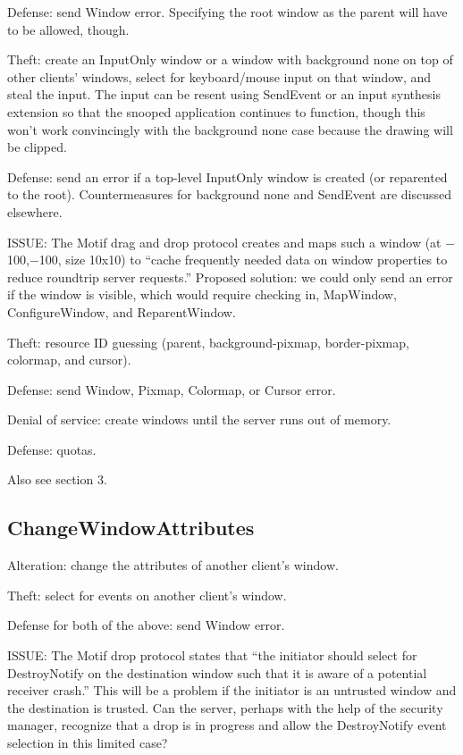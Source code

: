 Defense: send Window error.  Specifying the root window as the parent will
have to be allowed, though.

Theft: create an InputOnly window or a window with background none on
top of other clients' windows, select for keyboard/mouse input on that
window, and steal the input.  The input can be resent using SendEvent
or an input synthesis extension so that the snooped application
continues to function, though this won't work convincingly with the
background none case because the drawing will be clipped.

Defense: send an error if a top-level InputOnly window is created (or
reparented to the root).  Countermeasures for background none and
SendEvent are discussed elsewhere.

ISSUE: The Motif drag and drop protocol creates and maps such a window
(at $-$100,$-$100, size 10x10) to ``cache frequently needed data on
window properties to reduce roundtrip server requests.''  Proposed
solution: we could only send an error if the window is visible, which
would require checking in, MapWindow, ConfigureWindow, and
ReparentWindow.

Theft: resource ID guessing (parent, background-pixmap, border-pixmap,
colormap, and cursor).

Defense: send Window, Pixmap, Colormap, or Cursor error.

Denial of service: create windows until the server runs out of memory.

Defense: quotas.

Also see section 3.


\subsection{ChangeWindowAttributes}

Alteration: change the attributes of another client's window.

Theft: select for events on another client's window.

Defense for both of the above: send Window error.

ISSUE: The Motif drop protocol states that ``the initiator should
select for DestroyNotify on the destination window such that it is
aware of a potential receiver crash.''  This will be a problem if the
initiator is an untrusted window and the destination is trusted.  Can
the server, perhaps with the help of the security manager, recognize
that a drop is in progress and allow the DestroyNotify event selection
in this limited case?

